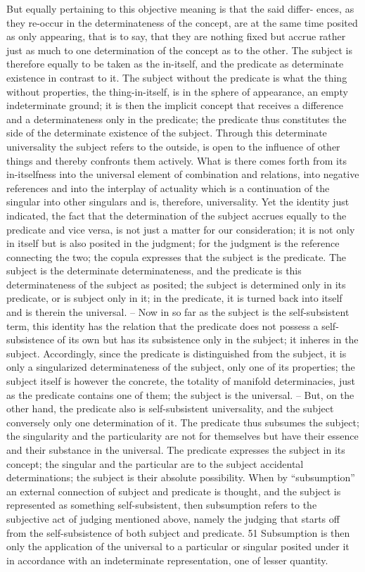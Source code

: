 But equally pertaining to this objective meaning is that the said differ-
ences, as they re-occur in the determinateness of the concept, are at the
same time posited as only appearing, that is to say, that they are nothing
fixed but accrue rather just as much to one determination of the concept as
to the other. The subject is therefore equally to be taken as the in-itself, and
the predicate as determinate existence in contrast to it. The subject without
the predicate is what the thing without properties, the thing-in-itself, is in
the sphere of appearance, an empty indeterminate ground; it is then the
implicit concept that receives a difference and a determinateness only in
the predicate; the predicate thus constitutes the side of the determinate
existence of the subject. Through this determinate universality the subject
refers to the outside, is open to the influence of other things and thereby
confronts them actively. What is there comes forth from its in-itselfness into
the universal element of combination and relations, into negative references
and into the interplay of actuality which is a continuation of the singular
into other singulars and is, therefore, universality.
Yet the identity just indicated, the fact that the determination of the
subject accrues equally to the predicate and vice versa, is not just a matter
for our consideration; it is not only in itself but is also posited in the
judgment; for the judgment is the reference connecting the two; the copula
expresses that the subject is the predicate. The subject is the determinate
determinateness, and the predicate is this determinateness of the subject as
posited; the subject is determined only in its predicate, or is subject only in
it; in the predicate, it is turned back into itself and is therein the universal. –
Now in so far as the subject is the self-subsistent term, this identity has the
relation that the predicate does not possess a self-subsistence of its own but
has its subsistence only in the subject; it inheres in the subject. Accordingly,
since the predicate is distinguished from the subject, it is only a singularized
determinateness of the subject, only one of its properties; the subject itself
is however the concrete, the totality of manifold determinacies, just as the
predicate contains one of them; the subject is the universal. – But, on the
other hand, the predicate also is self-subsistent universality, and the subject
conversely only one determination of it. The predicate thus subsumes the
subject; the singularity and the particularity are not for themselves but
have their essence and their substance in the universal. The predicate
expresses the subject in its concept; the singular and the particular are to the
subject accidental determinations; the subject is their absolute possibility.
When by “subsumption” an external connection of subject and predicate
is thought, and the subject is represented as something self-subsistent,
then subsumption refers to the subjective act of judging mentioned above,
namely the judging that starts off from the self-subsistence of both subject
and predicate. 51 Subsumption is then only the application of the universal to
a particular or singular posited under it in accordance with an indeterminate
representation, one of lesser quantity.

